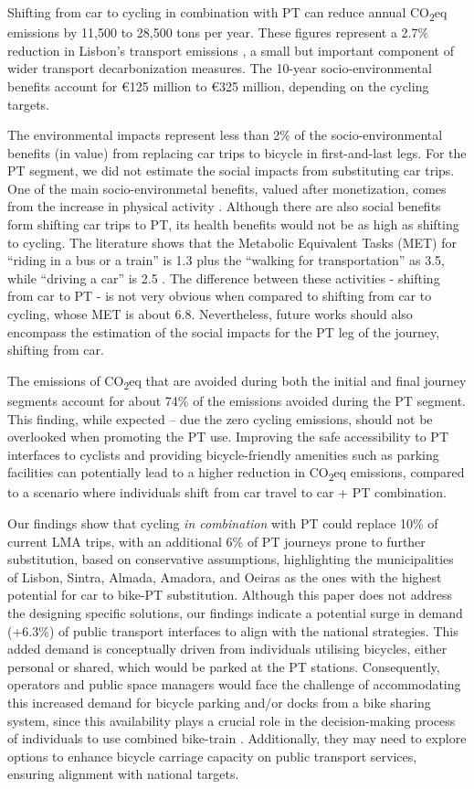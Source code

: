\documentclass[review, doubleblind, 3p,
authoryear]{elsarticle} %
\begin{document}
Shifting from car to cycling in combination with PT can reduce annual
CO\textsubscript{2}eq emissions by 11,500 to 28,500 tons per year. These
figures represent a 2.7\% reduction in Lisbon's transport emissions
\citep{LisboaENova}, a small but important component of wider transport
decarbonization measures. The 10-year socio-environmental benefits
account for €125 million to €325 million, depending on the cycling
targets.

The environmental impacts represent less than 2\% of the
socio-environmental benefits (in value) from replacing car trips to
bicycle in first-and-last legs. For the PT segment, we did not estimate
the social impacts from substituting car trips. One of the main
socio-environmetal benefits, valued after monetization, comes from the
increase in physical activity \citep{Felix2023ES}. Although there are
also social benefits form shifting car trips to PT, its health benefits
would not be as high as shifting to cycling. The literature shows that
the Metabolic Equivalent Tasks (MET) for ``riding in a bus or a train''
is 1.3 plus the ``walking for transportation'' as 3.5, while ``driving a
car'' is 2.5 \citep{MET2011}. The difference between these activities -
shifting from car to PT - is not very obvious when compared to shifting
from car to cycling, whose MET is about 6.8. Nevertheless, future works
should also encompass the estimation of the social impacts for the PT
leg of the journey, shifting from car.

The emissions of CO\textsubscript{2}eq that are avoided during both the
initial and final journey segments account for about 74\% of the
emissions avoided during the PT segment. This finding, while expected --
due the zero cycling emissions, should not be overlooked when promoting
the PT use. Improving the safe accessibility to PT interfaces to
cyclists and providing bicycle-friendly amenities such as parking
facilities can potentially lead to a higher reduction in
CO\textsubscript{2}eq emissions, compared to a scenario where
individuals shift from car travel to car + PT combination.

Our findings show that cycling \emph{in combination} with PT could
replace 10\% of current LMA trips, with an additional 6\% of PT journeys
prone to further substitution, based on conservative assumptions,
highlighting the municipalities of Lisbon, Sintra, Almada, Amadora, and
Oeiras as the ones with the highest potential for car to bike-PT
substitution. Although this paper does not address the designing
specific solutions, our findings indicate a potential surge in demand
(+6.3\%) of public transport interfaces to align with the national
strategies. This added demand is conceptually driven from individuals
utilising bicycles, either personal or shared, which would be parked at
the PT stations. Consequently, operators and public space managers would
face the challenge of accommodating this increased demand for bicycle
parking and/or docks from a bike sharing system, since this availability
plays a crucial role in the decision-making process of individuals to
use combined bike-train \citep{jonkeren2021bicycle}. Additionally, they
may need to explore options to enhance bicycle carriage capacity on
public transport services, ensuring alignment with national targets.
\end{document}
